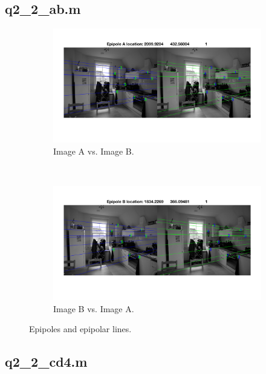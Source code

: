 \documentclass[a4paper, 10pt, conference]{ieeeconf}
\begin{document}
\subsection*{q2\_2\_ab.m}

\begin{figure}[!ht]
  \captionsetup[subfigure]{position=b}
  \centering
    \begin{subfigure}{0.45\linewidth}
        \includegraphics[width=\linewidth]{pic/q2_2_ab_A_0}
      \caption{Image A  vs. Image B.}
    \end{subfigure}
    ~
    \begin{subfigure}{0.45\linewidth}
        \includegraphics[width=\linewidth]{pic/q2_2_ab_B_0}
        \caption{Image B  vs. Image A.}
    \end{subfigure}

	\caption{Epipoles and epipolar lines.}
\end{figure}


\newpage

\subsection*{q2\_2\_cd4.m}
\end{document}
